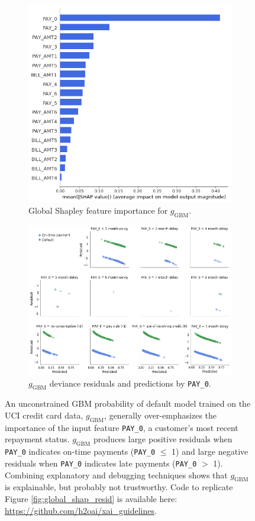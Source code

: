 \documentclass[sigconf]{acmart}
\begin{document}
\begin{figure}[htb!]
	\begin{subfigure}{.4\textwidth} \centering
  		\includegraphics[height=0.8\linewidth, width=0.75\linewidth]{img/global_shap.png}
  		\caption{Global Shapley feature importance for $g_{\text{GBM}}$.}
  		\label{fig:global_shap}
	\end{subfigure}
	\begin{subfigure}{.5\textwidth} \centering
		\vspace{5pt}\includegraphics[width=0.85\linewidth]{img/resid.png}
  		\caption{$g_{\text{GBM}}$ deviance residuals and predictions by \texttt{PAY\_0}.}
  		\label{fig:resid}
	\end{subfigure}
	\vspace{-8pt}
	\caption{An unconstrained GBM probability of default model trained on the UCI credit card data\cite{uci}, $g_{\text{GBM}}$, generally over-emphasizes the importance of the input feature \texttt{PAY\_0}, a customer's most recent repayment status. $g_{\text{GBM}}$ produces large positive residuals when \texttt{PAY\_0} indicates on-time payments (\texttt{PAY\_0} $\leq$ 1) and large negative residuals when \texttt{PAY\_0} indicates late payments (\texttt{PAY\_0} $>$ 1). Combining explanatory and debugging techniques shows that $g_{\text{GBM}}$ is explainable, but probably not trustworthy. Code to replicate Figure \ref{fig:global_shap_resid} is available here: \url{https://github.com/h2oai/xai_guidelines}.} 

\end{figure}
\end{document}
